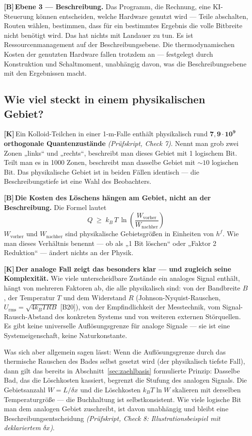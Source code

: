 \documentclass[11pt,a4paper]{article}
\newcommand{\LK}{\textcolor{layK}{\textbf{\footnotesize\textsf{[K]}}}\,}
\newcommand{\LB}{\textcolor{layB}{\textbf{\footnotesize\textsf{[B]}}}\,}
\newcommand{\pruef}[1]{{\small\itshape(Prüfskript, #1)}}
\begin{document}
\LB \textbf{Ebene 3 --- Beschreibung.} Das Programm, die Rechnung, eine
KI-Steuerung können entscheiden, welche Hardware genutzt wird --- Teile
abschalten, Routen wählen, bestimmen, dass für ein bestimmtes Ergebnis die volle
Bitbreite nicht benötigt wird. Das hat nichts mit Landauer zu tun. Es ist
Ressourcenmanagement auf der Beschreibungsebene. Die thermodynamischen Kosten der
genutzten Hardware fallen trotzdem an --- festgelegt durch Konstruktion und
Schaltmoment, unabhängig davon, was die Beschreibungsebene mit den Ergebnissen
macht.

\subsection{Wie viel steckt in einem physikalischen Gebiet?}

\LK Ein Kolloid-Teilchen in einer 1-\textmu m-Falle enthält physikalisch rund
$\mathbf{7{,}9\cdot10^{9}}$ \textbf{orthogonale Quantenzustände}
\pruef{Check 7}. Nennt man grob zwei Zonen „links“ und „rechts“, beschreibt man
dieses Gebiet mit 1 logischem Bit. Teilt man es in 1000 Zonen, beschreibt man
dasselbe Gebiet mit ${\sim}10$ logischen Bit. Das physikalische Gebiet ist in
beiden Fällen identisch --- die Beschreibungstiefe ist eine Wahl des Beobachters.

\LB \textbf{Die Kosten des Löschens hängen am Gebiet, nicht an der Beschreibung.}
Die Formel lautet
\[
  \boxed{\;Q \;\ge\; k_B\,T\,\ln\!\left(\frac{W_{\text{vorher}}}{W_{\text{nachher}}}\right)\;}
\]
$W_{\text{vorher}}$ und $W_{\text{nachher}}$ sind physikalische Gebietsgrößen in
Einheiten von $h^f$. Wie man dieses Verhältnis benennt --- ob als „1 Bit löschen“
oder „Faktor 2 Reduktion“ --- ändert nichts an der Physik.

\LK \textbf{Der analoge Fall zeigt das besonders klar --- und zugleich seine
Komplexität.} Wie viele unterscheidbare Zustände ein analoges Signal enthält,
hängt von mehreren Faktoren ab, die alle physikalisch sind: von der Bandbreite
$B$, der Temperatur $T$ und dem Widerstand $R$ (Johnson-Nyquist-Rauschen,
$U_{\text{rms}} = \sqrt{4 k_B T R B}$ [B20]), von der Empfindlichkeit der
Messtechnik, vom Signal-Rausch-Abstand des konkreten Systems und von weiteren
externen Störquellen. Es gibt keine universelle Auflösungsgrenze für analoge
Signale --- sie ist eine Systemeigenschaft, keine Naturkonstante.

Was sich aber allgemein sagen lässt: Wenn die Auflösungsgrenze durch das
thermische Rauschen des Bades selbst gesetzt wird (der physikalisch tiefste Fall),
dann gilt das bereits in Abschnitt~\ref{sec:zaehlbasis} formulierte Prinzip:
Dasselbe Bad, das die Löschkosten kassiert, begrenzt die Stufung des analogen
Signals. Die Gebietsanzahl $W = L/\delta x$ und die Löschkosten $k_B T \ln W$
skalieren mit derselben Temperaturgröße --- die Buchhaltung ist selbstkonsistent.
Wie viele logische Bit man dem analogen Gebiet zuschreibt, ist davon unabhängig
und bleibt eine Beschreibungsentscheidung \pruef{Check 8: Illustrationsbeispiel
mit deklariertem $\delta x$}.
\end{document}

